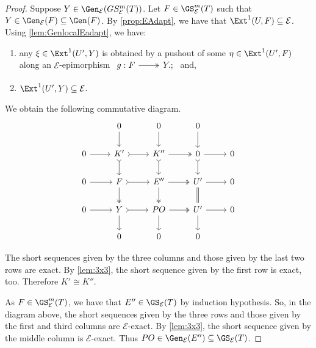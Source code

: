 \begin{proof}
Suppose $Y \in \Gen_\mathcal{E}(GS^{m}_{\mathcal{E}}(T))$. Let $F \in \GS^{m}_{\mathcal{E}}(T)$ such that $Y \in \Gen_{\mathcal{E}}(F) \subseteq \Gen(F)$. By \cref{prop:EAdapt}, we have that $\Ext^1(U,F) \subseteq \mathcal{E}$. Using \cref{lem:GenlocalEadapt}, we have:
\begin{enumerate}[label=$\bullet$, itemsep=1mm]
    \item any $\xi \in \Ext^1(U',Y)$ is obtained by a pushout of some $\eta \in \Ext^1(U',F)$ along an $\mathcal{E}$-epimorphism $\begin{tikzcd}
	 g: F & Y.;
	\arrow[two heads,from=1-1, to=1-2]
   \end{tikzcd}$ and,
   \item $\Ext^1(U',Y) \subseteq \mathcal{E}$.
\end{enumerate}
We obtain the following commutative diagram.
\[\begin{tikzcd}
         & 0 & 0 & 0 &  \\
	0 & K' & K''  & 0 &  0 \\
     0 & F & E'' & U' & 0 \\
      0 & Y & PO & U' & 0 \\
       & 0 & 0 & 0 & 
	\arrow[from=2-1, to=2-2]
	\arrow[tail, from=2-2, to=2-3]
	\arrow[two heads,from=2-3, to=2-4]
	\arrow[from=2-4, to=2-5]
        \arrow[from=3-1, to=3-2]
	\arrow[tail, from=3-2, to=3-3]
	\arrow[two heads,from=3-3, to=3-4]
	\arrow[from=3-4, to=3-5]
        \arrow[from=4-1, to=4-2]
	\arrow[tail, from=4-2, to=4-3]
	\arrow[two heads,from=4-3, to=4-4]
	\arrow[from=4-4, to=4-5]
        \arrow[from=4-2, to=5-2]
	\arrow[two heads, from=3-2, to=4-2]
	\arrow[tail,from=2-2, to=3-2]
	\arrow[from=1-2, to=2-2]
        \arrow[from=4-3, to=5-3]
	\arrow[two heads, from=3-3, to=4-3]
	\arrow[tail,from=2-3, to=3-3]
	\arrow[from=1-3, to=2-3]
        \arrow[from=4-4, to=5-4]
	\arrow[equals, from=3-4, to=4-4]
	\arrow[tail,from=2-4, to=3-4]
	\arrow[from=1-4, to=2-4]
\end{tikzcd} \]

The short sequences given by the three columns and those given by the last two rows are exact. By \cref{lem:3x3}, the short sequence given by the first row is exact, too. Therefore $K' \cong K''$.

As $F \in \GS^{m}_{\mathcal{E}}(T)$, we have that $E'' \in \GS_{\mathcal{E}}(T)$ by induction hypothesis. So, in the diagram above, the short sequences given by the three rows and those given by the first and third columns are $\mathcal{E}$-exact. By \cref{lem:3x3}, the short sequence given by the middle column is $\mathcal{E}$-exact. Thus $PO \in \Gen_\mathcal{E}(E'') \subseteq \GS_{\mathcal{E}}(T)$.


\end{proof}

